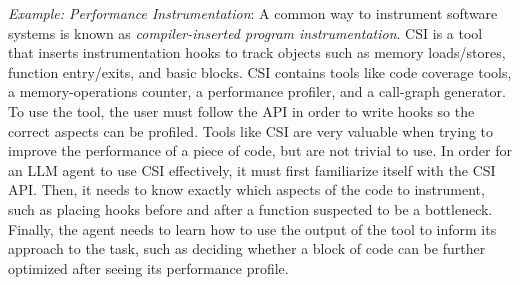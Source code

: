 \begin{tcolorbox}[colback=lightblue, boxrule=0pt, arc=5pt, outer arc=5pt, after skip=10pt plus 2pt]
\textit{Example: Performance Instrumentation}: A common way to instrument software systems is known as \textit{compiler-inserted program instrumentation}. CSI \citep{schardl2017csi} is a tool that inserts instrumentation hooks to track objects such as memory loads/stores, function entry/exits, and basic blocks. CSI contains tools like code coverage tools, a memory-operations counter, a performance profiler, and a call-graph generator. To use the tool, the user must follow the API in order to write hooks so the correct aspects can be profiled. Tools like CSI are very valuable when trying to improve the performance of a piece of code, but are not trivial to use. In order for an LLM agent to use CSI effectively, it must first familiarize itself with the CSI API. Then, it needs to know exactly which aspects of the code to instrument, such as placing hooks before and after a function suspected to be a bottleneck. Finally, the agent needs to learn how to use the output of the tool to inform its approach to the task, such as deciding whether a block of code can be further optimized after seeing its performance profile.
\end{tcolorbox}





